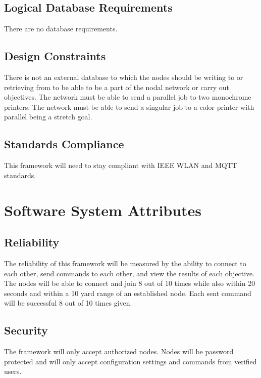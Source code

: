 \documentclass[draftclsnofoot, onecolumn, compsoc, 10pt]{IEEEtran}
\begin{document}
\subsection{Logical Database Requirements}
There are no database requirements. 

\subsection{Design Constraints}
There is not an external database to which the nodes should be writing to or retrieving from to be able to be a part of the nodal network or carry out objectives. The network must be able to send a parallel job to two monochrome printers. The network must be able to send a singular job to a color printer with parallel being a stretch goal.

\subsection{Standards Compliance}
This framework will need to stay compliant with IEEE WLAN and MQTT standards.





\section{Software System Attributes}
\subsection{Reliability}
The reliability of this framework will be measured by the ability to connect to each other, send commands to each other, and view the results of each objective. The nodes will be able to connect and join 8 out of 10 times while also within 20 seconds and within a 10 yard range of an established node. Each sent command will be successful 8 out of 10 times given.

\subsection{Security}
The framework will only accept authorized nodes. Nodes will be password protected and will only accept configuration settings and commands from verified users.
\end{document}
